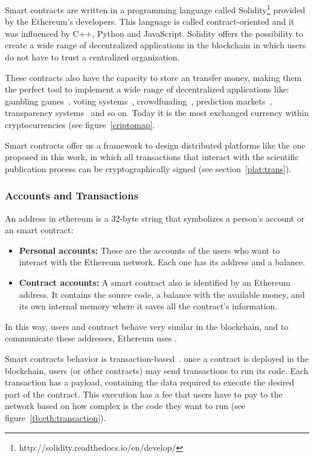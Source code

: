 Smart contracts are written in a programming language called
Solidity\footnote{http://solidity.readthedocs.io/en/develop/} provided by the
Ethereum's developers. This language is called contract-oriented and it was
influenced by C++, Python and JavaScript. Solidity offers the possibility to
create a wide range of decentralized applications in the blockchain in which
users do not have to trust a centralized organization.

These contracts also have the capacity to store an transfer money, making them
the perfect tool to implement a wide range of decentralized applications like:
gambling games~\cite{piasecki2016gaming}, voting
systems~\cite{mccorry2017smart}, crowdfunding~\cite{jacynycz2016betfunding},
prediction markets~\cite{peterson2015augur}, transparency
systems~\cite{bonneau2016ethiks} and so on. Today it is the most exchanged
currency within cryptocurrencies (see figure~\ref{criptomap}.

Smart contracts offer us a framework to design distributed platforms like the
one proposed in this work, in which all transactions that interact with the
scientific publication process can be cryptographically signed (see
section~\ref{plat:trans}).

\subsubsection*{Accounts and Transactions}
\label{ts:at}
An address in ethereum is a 32-byte string that symbolizes a person's account or
an smart contract:
\begin{itemize}
\item \textbf{Personal accounts:} These are the accounts of the users who want
  to interact with the Ethereum network. Each one has its address and a balance.
\item \textbf{Contract accounts:} A smart contract also is identified by an
  Ethereum address. It contains the source code, a balance with the available
  money, and its own internal memory where it saves all the contract's
  information.
\end{itemize}

In this way, users and contract behave very similar in the blockchain, and to
communicate these addresses, Ethereum uses .


Smart contracts behavior is transaction-based~\cite{wood2014ethereum}. once a
contract is deployed in the blockchain, users (or other contracts) may send
transactions to run its code. Each transaction has a payload, containing the
data required to execute the desired part of the contract. This execution has a
fee that users have to pay to the network based on how complex is the code they
want to run (see figure~\ref{tb:eth:transaction}).

